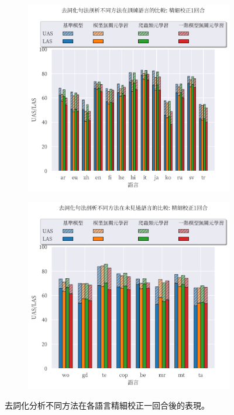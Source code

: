 \begin{figure}[htbp]
    \centering
    \begin{subfigure}[t]{0.8\textwidth}
        \centering
        \includegraphics[width=\textwidth]{figs/chapter3/delex/bar_full_epoch_1_train_langs.pdf}
    \end{subfigure}
    \vspace{-12pt}
    \begin{subfigure}[t]{0.8\textwidth}
        \centering
        \includegraphics[width=\textwidth]{figs/chapter3/delex/bar_full_epoch_1_test_langs.pdf}
    \end{subfigure}
    \caption{去詞化分析不同方法在各語言精細校正一回合後的表現。}
    \label{fig:bar_full_epoch_1}
\end{figure}
